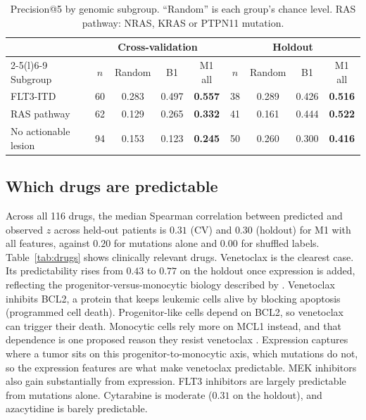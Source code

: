 \documentclass[11pt,logo,nonumbering]{preprint}
\newcommand{\z}{z}
\begin{document}
\begin{table}[ht]
\small
\centering
\caption{Precision@5 by genomic subgroup. ``Random'' is each group's chance level. RAS pathway: NRAS, KRAS or PTPN11 mutation.}
\label{tab:subgroups}
\begin{tabular}{@{}lcccccccc@{}}
\toprule
 & \multicolumn{4}{c}{Cross-validation} & \multicolumn{4}{c}{Holdout}\\
\cmidrule(lr){2-5}\cmidrule(l){6-9}
Subgroup & $n$ & Random & B1 & M1 all & $n$ & Random & B1 & M1 all\\
\midrule
FLT3-ITD & 60 & 0.283 & 0.497 & \textbf{0.557} & 38 & 0.289 & 0.426 & \textbf{0.516}\\
RAS pathway & 62 & 0.129 & 0.265 & \textbf{0.332} & 41 & 0.161 & 0.444 & \textbf{0.522}\\
No actionable lesion & 94 & 0.153 & 0.123 & \textbf{0.245} & 50 & 0.260 & 0.300 & \textbf{0.416}\\
\bottomrule
\end{tabular}
\end{table}

\subsection{Which drugs are predictable}
Across all 116 drugs, the median Spearman correlation between predicted and observed $\z$ across held-out patients is $0.31$ (CV) and $0.30$ (holdout) for M1 with all features, against $0.20$ for mutations alone and $0.00$ for shuffled labels. Table~\ref{tab:drugs} shows clinically relevant drugs. Venetoclax is the clearest case. Its predictability rises from $0.43$ to $0.77$ on the holdout once expression is added, reflecting the progenitor-versus-monocytic biology described by \citet{bottomly2022}. Venetoclax inhibits BCL2, a protein that keeps leukemic cells alive by blocking apoptosis (programmed cell death). Progenitor-like cells depend on BCL2, so venetoclax can trigger their death. Monocytic cells rely more on MCL1 instead, and that dependence is one proposed reason they resist venetoclax \citep{pei2020}. Expression captures where a tumor sits on this progenitor-to-monocytic axis, which mutations do not, so the expression features are what make venetoclax predictable. MEK inhibitors also gain substantially from expression. FLT3 inhibitors are largely predictable from mutations alone. Cytarabine is moderate ($0.31$ on the holdout), and azacytidine is barely predictable.
\end{document}

